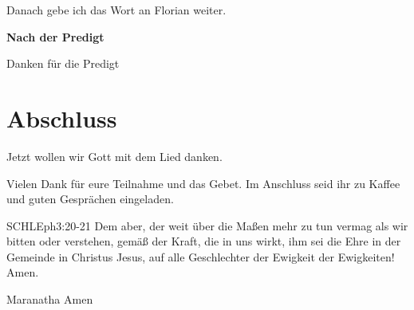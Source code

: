 Danach gebe ich das Wort an Florian weiter.

\textbf{Nach der Predigt}

Danken für die Predigt

\section{Abschluss}

Jetzt wollen wir Gott mit dem Lied  danken.


Vielen Dank für eure Teilnahme und das Gebet. Im Anschluss seid ihr zu Kaffee und guten Gesprächen eingeladen.
\beten{}

\begin{bibelbox}{SCHL}{Eph}{3:20-21}
Dem aber, der weit über die Maßen mehr zu tun vermag als wir bitten oder verstehen, gemäß der Kraft, die in uns wirkt, ihm sei die Ehre in der Gemeinde in Christus Jesus, auf alle Geschlechter der Ewigkeit der Ewigkeiten! Amen.
\end{bibelbox}

Maranatha Amen
